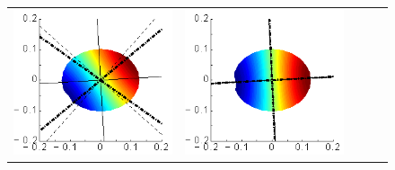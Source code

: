 \documentclass[a4paper,11pt]{article}
\begin{document}
\begin{figure}[h]
\begin{tabular*}{1\textwidth}{c|cc|cc|}
\begin{minipage}{0.22\linewidth}
	\includegraphics[width=1\linewidth]{./images/SAFE/SAFE_CS_10x8_HTI_45/P_s_3_0kHz-pstool.eps}		
\end{minipage}&
\begin{minipage}{0.22\linewidth}
	\includegraphics[width=1\linewidth]{./images/SAFE/SAFE_CS_10x8_HTI_45/P_s_7_2kHz-pstool.eps}	

\end{minipage}
\end{tabular*}
\end{figure}
\end{document}

